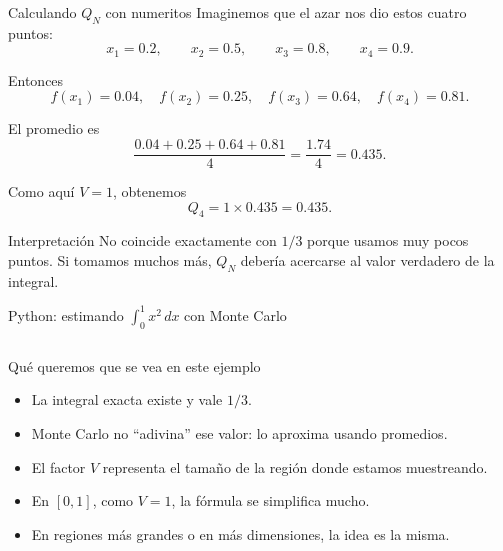 \begin{frame}{Calculando $Q_N$ con numeritos}
\justifying
Imaginemos que el azar nos dio estos cuatro puntos:
\begin{equation*}
x_1=0.2,\qquad x_2=0.5,\qquad x_3=0.8,\qquad x_4=0.9.
\end{equation*}

Entonces
\begin{equation*}
f(x_1)=0.04,\quad f(x_2)=0.25,\quad f(x_3)=0.64,\quad f(x_4)=0.81.
\end{equation*}

El promedio es
\begin{equation*}
\frac{0.04+0.25+0.64+0.81}{4}=\frac{1.74}{4}=0.435.
\end{equation*}

Como aquí $V=1$, obtenemos
\begin{equation*}
Q_4 = 1\times 0.435 = 0.435.
\end{equation*}

\begin{alertblock}{Interpretación}
No coincide exactamente con $1/3$ porque usamos muy pocos puntos. Si tomamos
muchos más, $Q_N$ debería acercarse al valor verdadero de la integral.
\end{alertblock}
\end{frame}

\begin{frame}[fragile]{Python: estimando $\int_0^1 x^2\,dx$ con Monte Carlo}
\inputminted[fontsize=\scriptsize]{python}{montecarlo_x2.py}
\end{frame}

\begin{frame}{Qué queremos que se vea en este ejemplo}
\begin{itemize}
    \item La integral exacta existe y vale $1/3$.
    \item Monte Carlo no ``adivina'' ese valor: lo aproxima usando promedios.
    \item El factor $V$ representa el tamaño de la región donde estamos muestreando.
    \item En $[0,1]$, como $V=1$, la fórmula se simplifica mucho.
    \item En regiones más grandes o en más dimensiones, la idea es la misma.
\end{itemize}
\end{frame}

